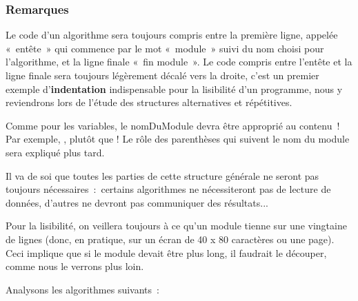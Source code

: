 
		\subsubsection*{Remarques}
		
		\begin{liste}
		\item {
			Le code d’un algorithme sera toujours compris entre la
			première ligne, appelée «~entête~» qui commence par 
			le mot «~module~»
			suivi du nom choisi pour l’algorithme, et la ligne
			finale «~fin module~». Le code compris entre l’entête
			et la ligne finale sera toujours légèrement décalé vers la droite,
			c’est un premier exemple
			d’\textbf{indentation} indispensable pour la
			lisibilité d’un programme, nous y reviendrons lors de
			l’étude des structures alternatives et répétitives.}
		\item {
			Comme pour les variables, le nomDuModule devra être approprié au
            contenu~! Par exemple, , 
			 plutôt que 
			!
			Le rôle des parenthèses qui suivent le nom du module sera expliqué plus
			tard.}
		\item {
			Il va de soi que toutes les parties de cette structure générale ne
			seront pas toujours nécessaires~:~certains algorithmes ne nécessiteront
			pas de lecture de données, d’autres ne devront pas
			communiquer des résultats...}
		\item {
			Pour la lisibilité, on veillera toujours à ce qu’un module
			tienne sur une vingtaine de lignes (donc, en pratique, sur un écran 
			de 40 x 80 caractères ou une page). Ceci implique que si le module 
			devait être plus long, il faudrait le découper, comme nous le verrons 
			plus loin.}
		\end{liste}

		\bigskip

		Analysons les algorithmes suivants~:
		
		
